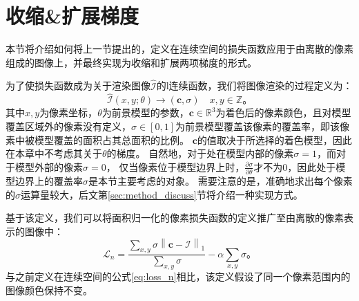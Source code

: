 \section{收缩\&扩展梯度}

本节将介绍如何将上一节提出的，定义在连续空间的损失函数应用于由离散的像素组成的图像上，并最终实现为收缩和扩展两项梯度的形式。

为了使损失函数成为关于渲染图像$\hat{\mathcal{I}}$的l连续函数，我们将图像渲染的过程定义为：
\begin{equation}
\hat{\mathcal{I}}(x,y;\theta) \to (\mathbf{c}, \sigma) \quad x,y \in \mathbb{Z}
\text{。}
\end{equation}
其中$x,y$为像素坐标，$\theta$为前景模型的参数，$\mathbf{c}\in\mathbb{R}^3$为着色后的像素颜色，且对模型覆盖区域外的像素没有定义，$\sigma\in[0,1]$为前景模型覆盖该像素的覆盖率，即该像素中被模型覆盖的面积占其总面积的比例。
$\mathbf{c}$的值取决于所选择的着色模型，因此在本章中不考虑其关于$\theta$的梯度。
自然地，对于处在模型内部的像素$\sigma=1$，而对于模型外部的像素$\sigma=0$，
仅当像素位于模型边界上时，$\frac{\partial\sigma}{\partial\theta}$才不为0，因此处于模型边界上的覆盖率$\sigma$是本节主要考虑的对象。
需要注意的是，准确地求出每个像素的$\sigma$运算量较大，后文第\ref{sec:method_discuss}节将介绍一种实现方式。

基于该定义，我们可以将面积归一化的像素损失函数的定义推广至由离散的像素表示的图像中：
\begin{equation}
\mathcal{L}_n = \frac{\sum_{x,y} \sigma \left\| \mathbf{c} - \mathcal{I} \right\|_1}
{\sum_{x,y} \sigma} - \alpha \sum_{x,y} \sigma
\text{。}
\label{eq:loss_n_pixel}
\end{equation}
与之前定义在连续空间的公式\ref{eq:loss_n}相比，该定义假设了同一个像素范围内的图像颜色保持不变。

